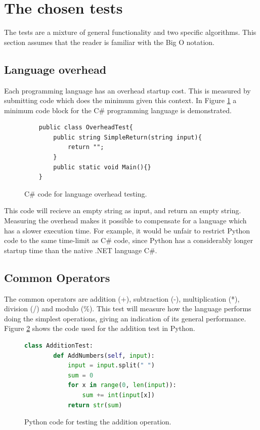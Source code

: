 \section{The chosen tests}
The tests are a mixture of general functionality and two specific algorithms. This section assumes that the reader is familiar with the Big O notation.

\subsection{Language overhead}
Each programming language has an overhead startup cost. This is measured by submitting code which does the minimum given this context. In Figure \ref{fig:language_overhead} a minimum code block for the C\# programming language is demonstrated.

\begin{figure}[h]
	\lstset{style=sharpc}
	\begin{lstlisting}
	public class OverheadTest{
		public string SimpleReturn(string input){
			return "";
		}
		public static void Main(){}
	}
	\end{lstlisting}
	\caption{C\# code for language overhead testing.}
	\label{fig:language_overhead}
\end{figure}

This code will recieve an empty string as input, and return an empty string. Measuring the overhead makes it possible to compensate for a language which has a slower execution time. For example, it would be unfair to restrict Python code to the same time-limit as C\# code, since Python has a considerably longer startup time than the native .NET language C\#. 

\subsection{Common Operators}
The common operators are addition (+), subtraction (-), multiplication (*), division (/) and modulo (\%). This test will measure how the language performs doing the simplest operations, giving an indication of its general performance. Figure \ref{fig:addition_test} shows the code used for the addition test in Python.

\begin{figure}[h]
	\lstset{style=sharpc}
	\begin{lstlisting}[language=python]
	class AdditionTest:
	    def AddNumbers(self, input):
	        input = input.split(" ")
	        sum = 0
	        for x in range(0, len(input)):
	            sum += int(input[x])
	        return str(sum)
	\end{lstlisting}
	\caption{Python code for testing the addition operation.}
	\label{fig:addition_test}
\end{figure}

